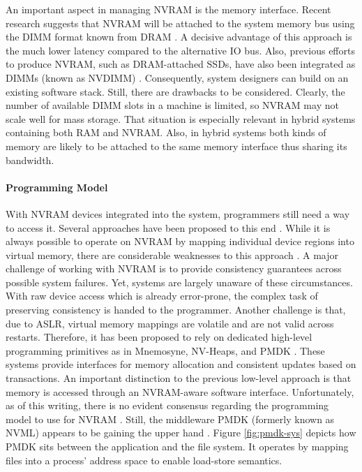 An important aspect in managing \ac{NVRAM} is the memory interface. Recent
research suggests that \ac{NVRAM} will be attached to the system memory bus
using the \ac{DIMM} format known from \ac{DRAM} \cite{volos2017whisper,
oukid2017data, andrei2017sap}. A decisive advantage of this
approach is the much lower latency compared to the alternative \ac{IO} bus.
Also, previous efforts to produce \ac{NVRAM}, such as DRAM-attached SSDs, have
also been integrated as \acp{DIMM} (known as \ac{NVDIMM})
\cite{dulloor2014system, huang2014design}. Consequently, system designers can
build on an existing software stack. Still, there are drawbacks to be
considered. Clearly, the number of available \ac{DIMM} slots in a machine is
limited, so \ac{NVRAM} may not scale well for mass storage. That situation is
especially relevant in hybrid systems containing both \ac{RAM} and \ac{NVRAM}.
Also, in hybrid systems both kinds of memory are likely to be attached to the
same memory interface thus sharing its bandwidth.

\paragraph{Programming Model}

With \ac{NVRAM} devices integrated into the system, programmers still need a way
to access it. Several approaches have been proposed to this end
\cite{volos2017whisper}. While it is always possible to operate on \ac{NVRAM} by
mapping individual device regions into virtual memory, there are considerable
weaknesses to this approach \cite{condit2009better, volos2011mnemosyne,
dulloor2014system, volos2017whisper}. A major challenge of working with
\ac{NVRAM} is to provide consistency guarantees across possible system failures.
Yet, systems are largely unaware of these circumstances. With raw device access
which is already error-prone, the complex task of preserving consistency is
handed to the programmer. Another challenge is that, due to \ac{ASLR}, virtual
memory mappings are volatile and are not valid across restarts. Therefore, it
has been proposed to rely on dedicated high-level programming primitives as in
Mnemosyne, NV-Heaps, and PMDK \cite{volos2011mnemosyne, coburn2011nv_heaps,
rudoff2017persistent}. These systems provide interfaces for memory allocation
and consistent updates based on transactions. An important distinction to the
previous low-level approach is that memory is accessed through an
\ac{NVRAM}-aware software interface. Unfortunately, as of this writing, there is
no evident consensus regarding the programming model to use for \ac{NVRAM}
\cite{boehm2016persistence}. Still, the middleware PMDK (formerly known as NVML)
appears to be gaining the upper hand \cite{oukid2017data, volos2017whisper,
malinowski2017using, andrei2017sap}. Figure \ref{fig:pmdk-sys} depicts how PMDK
sits between the application and the file system. It operates by mapping files
into a process' address space to enable load-store semantics.

